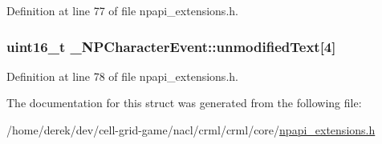 Definition at line 77 of file npapi\_\-extensions.h.

\hypertarget{struct___n_p_character_event_aeee174e5d5a95049110b4b17c6e57cd3}{
\subsubsection[{unmodifiedText}]{\setlength{\rightskip}{0pt plus 5cm}uint16\_\-t {\bf \_\-NPCharacterEvent::unmodifiedText}\mbox{[}4\mbox{]}}}
\label{struct___n_p_character_event_aeee174e5d5a95049110b4b17c6e57cd3}


Definition at line 78 of file npapi\_\-extensions.h.



The documentation for this struct was generated from the following file:\begin{DoxyCompactItemize}
\item 
/home/derek/dev/cell-\/grid-\/game/nacl/crml/crml/core/\hyperlink{npapi__extensions_8h}{npapi\_\-extensions.h}\end{DoxyCompactItemize}
